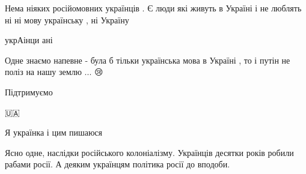 \begin{itemize}
 

Нема ніяких російомовних українців . Є люди які живуть в Україні і не люблять
ні ні мову українську , ні Україну


 
укрАінци ані

 

Одне знаємо напевне - була б тільки українська мова в Україні , то і путін не
поліз на нашу землю ... 😢

 
Підтримуємо

 
🇺🇦

 
Я українка і цим пишаюся

 

Ясно одне, наслідки російського колоніалізму. Українців десятки років робили
рабами росії. А деяким українцям політика росії до вподоби.



\end{itemize}
